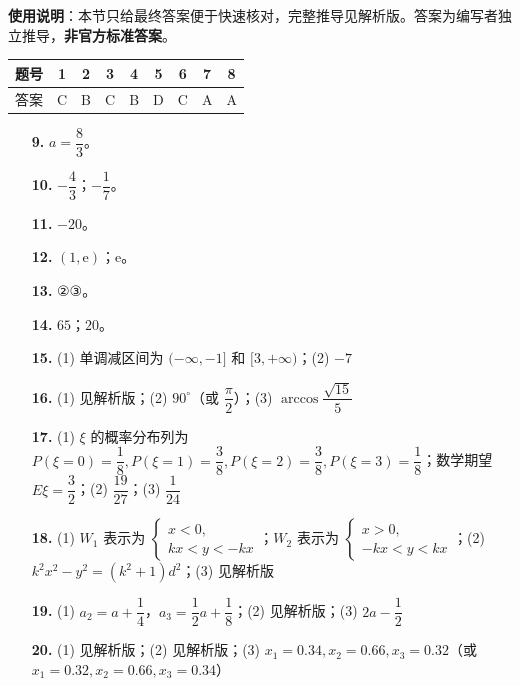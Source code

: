 
\begin{gknotice}
\textbf{使用说明}：本节只给最终答案便于快速核对，完整推导见解析版。答案为编写者独立推导，\textbf{非官方标准答案}。
\end{gknotice}

\begin{center}\begin{tabular}{ccccccccc}
\toprule
题号 & 1 & 2 & 3 & 4 & 5 & 6 & 7 & 8 \\
\midrule
答案 & C & B & C & B & D & C & A & A \\
\bottomrule
\end{tabular}\end{center}

\begin{itemize}[leftmargin=2.6em]
  \item[\textbf{9.}] $a = \dfrac{8}{3}$。
  \item[\textbf{10.}] $-\dfrac{4}{3}$；$-\dfrac{1}{7}$。
  \item[\textbf{11.}] $-20$。
  \item[\textbf{12.}] $(1, \mathrm{e})$；$\mathrm{e}$。
  \item[\textbf{13.}] ②③。
  \item[\textbf{14.}] $65$；$20$。
\end{itemize}

\begin{itemize}[leftmargin=2.6em]
  \item[\textbf{15.}] (1) 单调减区间为 $(-\infty, -1]$ 和 $[3, +\infty)$；(2) $-7$
  \item[\textbf{16.}] (1) 见解析版；(2) $90^\circ$（或 $\dfrac{\pi}{2}$）；(3) $\arccos\dfrac{\sqrt{15}}{5}$
  \item[\textbf{17.}] (1) $\xi$ 的概率分布列为 $P(\xi=0)=\dfrac{1}{8}, P(\xi=1)=\dfrac{3}{8}, P(\xi=2)=\dfrac{3}{8}, P(\xi=3)=\dfrac{1}{8}$；数学期望 $E\xi = \dfrac{3}{2}$；(2) $\dfrac{19}{27}$；(3) $\dfrac{1}{24}$
  \item[\textbf{18.}] (1) $W_1$ 表示为 $\begin{cases} x < 0, \\ kx < y < -kx \end{cases}$；$W_2$ 表示为 $\begin{cases} x > 0, \\ -kx < y < kx \end{cases}$；(2) $k^2 x^2 - y^2 = (k^2 + 1)d^2$；(3) 见解析版
  \item[\textbf{19.}] (1) $a_2 = a + \dfrac{1}{4}$，$a_3 = \dfrac{1}{2}a + \dfrac{1}{8}$；(2) 见解析版；(3) $2a - \dfrac{1}{2}$
  \item[\textbf{20.}] (1) 见解析版；(2) 见解析版；(3) $x_1 = 0.34, x_2 = 0.66, x_3 = 0.32$（或 $x_1 = 0.32, x_2 = 0.66, x_3 = 0.34$）
\end{itemize}
